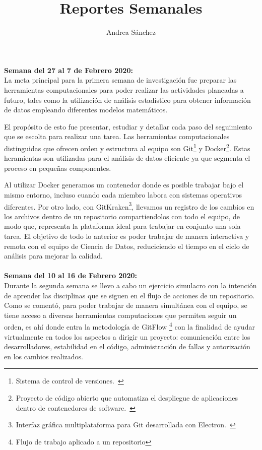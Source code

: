 \documentclass{article}
\title{Reportes Semanales}
\author{Andrea Sánchez}
\begin{document}
\maketitle
    \textbf{Semana del 27 al 7 de Febrero 2020:} \\
    La meta principal para la primera semana de investigación fue preparar las herramientas computacionales para poder realizar las actividades planeadas a futuro, tales como la utilización de análisis estadístico para obtener información de datos empleando diferentes modelos matemáticos.

    El propósito de esto fue presentar, estudiar y detallar cada paso del seguimiento que se escolta para realizar una tarea. Las herramientas computacionales distinguidas que ofrecen orden y estructura al equipo son Git\footnote{Sistema de control de versiones.~\cite{bergh2019}} y Docker\footnote{Proyecto de código abierto que automatiza el despliegue de aplicaciones dentro de contenedores de software.~\cite{bergh2019}}.
        Estas heramientas son utilizadas para el análisis de datos eficiente ya que segmenta el proceso en pequeñas componentes.

    Al utilizar Docker generamos un contenedor donde es posible trabajar bajo el mismo entorno, incluso cuando cada miembro labora con sistemas operativos diferentes. Por otro lado, con GitKraken\footnote{Interfaz gráfica multiplataforma para Git desarrollada con Electron.~\cite{bergh2019}}, llevamos un registro de los cambios en los archivos dentro de un repositorio compartiendolos con todo el equipo, de modo que, representa la plataforma ideal para trabajar en conjunto una sola tarea.
    El objetivo de todo lo anterior es poder trabajar de manera interactiva y remota con el equipo de Ciencia de Datos, reduciciendo el tiempo en el ciclo de análisis para mejorar la calidad.
\\ \\ 
    \textbf{Semana del 10 al 16 de Febrero 2020:} \\
    Durante la segunda semana se llevo a cabo un ejercicio simulacro con la intención de aprender las disciplinas que se siguen en el flujo de acciones de un repositorio. Como se comentó, para poder trabajar de manera simultánea con el equipo, se tiene acceso a diversas herramientas computaciones que permiten seguir un orden, es ahí donde entra la metodología de GitFlow \footnote{Flujo de trabajo aplicado a un repositorio} con la finalidad de ayudar virtualmente en todos los aspectos a dirigir un proyecto: comunicación entre los desarrolladores, estabilidad en el código, administración de fallas y autorización en los cambios realizados.
\end{document}
